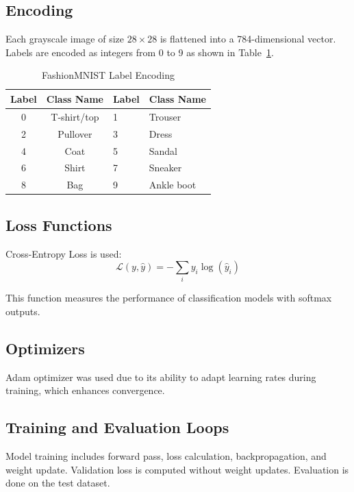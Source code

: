 \documentclass[a4paper, journal]{IEEEtran}
\begin{document}
\subsection{Encoding}
Each grayscale image of size \(28 \times 28\) is flattened into a 784-dimensional vector. Labels are encoded as integers from 0 to 9 as shown in Table~\ref{tab:label_encoding}.
\begin{table}[h]
    \centering
    \caption{FashionMNIST Label Encoding}
    \label{tab:label_encoding}
    \begin{tabular}{ccll}
        \toprule
        \textbf{Label} & \textbf{Class Name} & \textbf{Label} & \textbf{Class Name} \\
        \midrule
        0              & T-shirt/top         & 1              & Trouser             \\
        2              & Pullover            & 3              & Dress               \\
        4              & Coat                & 5              & Sandal              \\
        6              & Shirt               & 7              & Sneaker             \\
        8              & Bag                 & 9              & Ankle boot          \\
        \bottomrule
    \end{tabular}
\end{table}


\subsection{Loss Functions}
Cross-Entropy Loss is used:
\begin{equation}
    \mathcal{L}(y, \hat{y}) = -\sum_{i} y_i \log(\hat{y}_i)
\end{equation}

This function measures the performance of classification models with softmax outputs.

\subsection{Optimizers}
Adam optimizer was used due to its ability to adapt learning rates during training, which enhances convergence.

\subsection{Training and Evaluation Loops}
Model training includes forward pass, loss calculation, backpropagation, and weight update. Validation loss is computed without weight updates. Evaluation is done on the test dataset.
\end{document}
